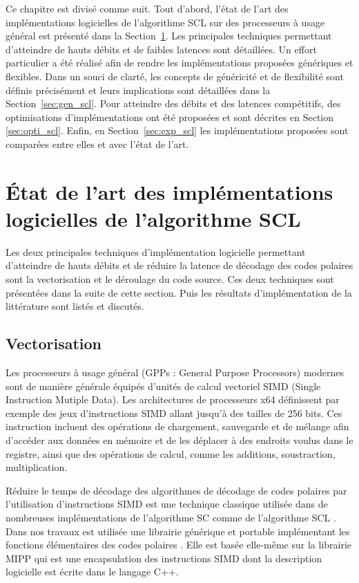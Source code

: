 Ce chapitre est divisé comme suit. Tout d'abord, l'état de l'art des implémentations logicielles de l'algorithme SCL sur des processeurs à usage général est présenté dans la Section~\ref{sec:art_scl}. Les principales techniques permettant d'atteindre de hauts débits et de faibles latences sont détaillées. Un effort particulier a été réalisé afin de rendre les implémentations proposées génériques et flexibles. Dans un souci de clarté, les concepts de généricité et de flexibilité sont définis précisément et leurs implications sont détaillées dans la Section~\ref{sec:gen_scl}. Pour atteindre des débits et des latences compétitifs, des optimisations d'implémentations ont été proposées et sont décrites en Section \ref{sec:opti_scl}. Enfin, en Section~\ref{sec:exp_scl} les implémentations proposées sont comparées entre elles et avec l'état de l'art.

\section{\'Etat de l'art des implémentations logicielles de l'algorithme SCL}
\label{sec:art_scl}
Les deux principales techniques d'implémentation logicielle permettant d'atteindre de hauts débits et de réduire la latence de décodage des codes polaires sont la vectorisation et le déroulage du code source. Ces deux techniques sont présentées dans la suite de cette section. Puis les résultats d'implémentation de la littérature sont listés et discutés.

\subsection{Vectorisation}
Les processeurs à usage général (GPPs : General Purpose Processors) modernes sont de manière générale équipés d'unités de calcul vectoriel SIMD (Single Instruction Mutiple Data). Les architectures de processeurs x64 définissent par exemple des jeux d'instructions SIMD allant jusqu'à des tailles de 256 bits. Ces instruction incluent des opérations de chargement, sauvegarde et de mélange afin d'accéder aux données en mémoire et de les déplacer à des endroits voulus dans le registre, ainsi que des opérations de calcul, comme les additions, soustraction, multiplication.

Réduire le temps de décodage des algorithmes de décodage de codes polaires par l'utilisation d'instructions SIMD est une technique classique utilisée dans de nombreuses implémentations de l'algorithme SC \cite{giard_fast_2014,giard_low-latency_2016,sarkis_fast_2014,sarkis_autogenerating_2014,giard_low-latency_2016,gal_software_2014,cassagne_efficient_2015,cassagne_energy_2016,gal_multi-gb/s_2015} comme de l'algorithme SCL \cite{sarkis_increasing_2014,sarkis_fast_2016,shen_low-latency_2016}. Dans nos travaux est utilisée une librairie générique et portable implémentant les fonctions élémentaires des codes polaires \cite{cassagne_efficient_2015}. Elle est basée elle-même sur la librairie MIPP \cite{cassagne2018mipp} qui est une encapsulation des instructions SIMD dont la description logicielle est écrite dans le langage C++.


